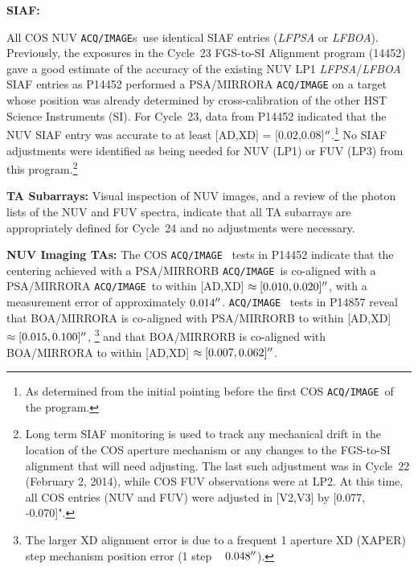 \documentclass{stsci_report}
\def\arcsec{\hbox{$^{\prime\prime}$}}
\newcommand{\tacq}[1]{\texttt{ACQ/#1}}
\begin{document}
\begin{description}
\item{\bf SIAF:}{
	All COS NUV \tacq{IMAGE}s~use identical SIAF entries ({\it LFPSA} or {\it LFBOA}).
	Previously, the exposures in the Cycle~23 FGS-to-SI Alignment program (14452) gave a good estimate of the accuracy of the existing NUV LP1 {\it LFPSA}/{\it LFBOA} SIAF entries
	as P14452 performed a PSA/MIRRORA \tacq{IMAGE} on a target whose position was already determined by cross-calibration of the other HST Science Instruments (SI).
	For Cycle~23, data from P14452 indicated that the NUV SIAF entry was accurate to at least [AD,XD] = [0.02,0.08]$\arcsec$.\footnote{As determined from the initial pointing before the first COS \tacq{IMAGE}~of the program.}
	No SIAF adjustments were identified as being needed for NUV (LP1) or FUV (LP3) from this program.\footnote{Long term SIAF monitoring is used to track any mechanical drift in the location of the COS aperture mechanism or any changes to the FGS-to-SI alignment that will need adjusting.
	The last such adjustment was in Cycle~22 (February 2, 2014), while COS FUV observations were at LP2. At this time, all COS entries (NUV and FUV) were adjusted in [V2,V3] by [0.077, -0.070]". }

}
\item{\bf TA Subarrays:} Visual inspection of NUV images, and a review of the photon lists of the NUV and FUV spectra, indicate that all TA subarrays are appropriately defined for Cycle~24 and no adjustments were necessary.
\item{\bf NUV Imaging TAs:}
	The COS \tacq{IMAGE}~ tests in P14452 indicate that the centering achieved with a PSA/MIRRORB \tacq{IMAGE}~is co-aligned with a PSA/MIRRORA \tacq{IMAGE}~to within [AD,XD] $\approx [0.010,0.020]\arcsec$, with a measurement error of approximately $0.014\arcsec$.
	\tacq{IMAGE}~ tests in P14857 reveal that BOA/MIRRORA is co-aligned with PSA/MIRRORB to within [AD,XD] $\approx [0.015,0.100]\arcsec$,
	\footnote{The larger XD alignment error is due to a frequent 1 aperture XD (XAPER) step mechanism position error (1 step ~ $0.048\arcsec$).}
	and that BOA/MIRRORB is co-aligned with BOA/MIRRORA to within [AD,XD] $\approx [0.007,0.062]\arcsec$.


\end{description}
\end{document}
